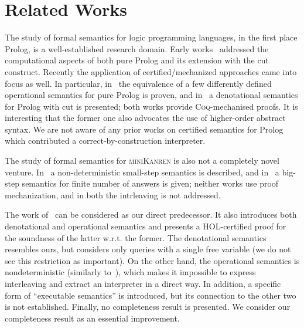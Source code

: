 \section{Related Works}

The study of formal semantics for logic programming languages, in the first place Prolog, is a well-established research domain. Early
works~\cite{JonesMycroftSemantics,DebrayMishraSemantics} addressed the computational aspects of both pure Prolog and its extension
with the cut construct. Recently the application of certified/mechanized approaches came into focus as well. In particular,
in~\cite{CertifiedPrologEquivalences} the equivalence of a few differently defined operational semantics
for pure Prolog is proven, and in~\cite{CeritfiedDenotationalCut} a denotational semantics for Prolog with cut is presented; both
works provide \textsc{Coq}-mechanised proofs. It is interesting that the former one also advocates the use of higher-order
abstract syntax. We are not aware of any prior works on certified semantics for Prolog which contributed a correct-by-construction
interpreter.

The study of formal semantics for \textsc{miniKanren} is also not a completely novel venture. In~\cite{RelConversion} a non-deterministic
small-step semantics is described, and in~\cite{DivTest} a big-step semantics for finite number of answers is given;
neither works use proof mechanization, and in both the intrleaving is not addressed. 

The work of~\citet{MechanisingMiniKanren} can be considered as our direct predecessor. It also introduces both denotational and
operational semantics and presents a HOL-certified proof for the soundness of the latter w.r.t. the former. The denotational
semantics resembles ours, but considers only queries with a single free variable (we do not see this restriction as important).
On the other hand, the operational semantics is nondeterministic (similarly to~\cite{RelConversion}), which makes it
impossible to express interleaving and extract an interpreter in a direct way. In addition, a specific form of ``executable semantics''
is introduced, but its connection to the other two is not established. Finally, no completeness result is presented.
We consider our completeness result as an essential improvement. 




